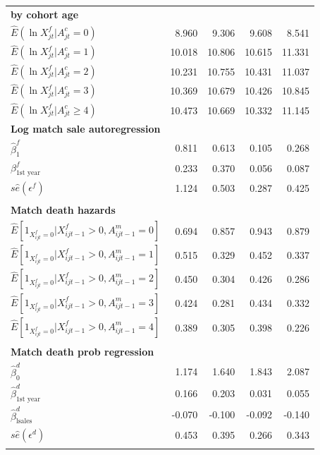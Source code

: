 \documentclass[12pt,titlepage]{article}
\begin{document}
\begin{small}
\begin{longtable}{l|rrrr}
\textbf{by cohort age } &  &  &  &  \\ 
$\widehat{E}(\ln X_{jt}^{f}|A_{jt}^{c}=0)$ & 8.960 & 9.306 & 9.608 & 8.541
\\ 
$\widehat{E}(\ln X_{jt}^{f}|A_{jt}^{c}=1)$ & 10.018 & 10.806 & 10.615 & 
11.331 \\ 
$\widehat{E}(\ln X_{jt}^{f}|A_{jt}^{c}=2)$ & 10.231 & 10.755 & 10.431 & 
11.037 \\ 
$\widehat{E}(\ln X_{jt}^{f}|A_{jt}^{c}=3)$ & 10.369 & 10.679 & 10.426 & 
10.845 \\ 
$\widehat{E}(\ln X_{jt}^{f}|A_{jt}^{c}\geq 4)$ & 10.473 & 10.669 & 10.332 & 
11.145 \\
\textbf{Log match sale autoregression} &  &  &  &  \\ 
$\widehat{\beta }_{1}^{f}$ & 0.811 & 0.613 & 0.105 & 0.268 \\ 
$\beta _{\mbox{1st
year}}^{f}$ & 0.233 & 0.370 & 0.056 & 0.087 \\ 
$s\widehat{e}(\epsilon ^{f})$ & 1.124 & 0.503 & 0.287 & 0.425 \\ 
&  &  &  &  \\ 
\textbf{Match death hazards} &  &  &  &  \\ 
$\widehat{E}[1_{X_{ijt}^{f}=0}|X_{ijt-1}^{f}>0,A_{ijt-1}^{m}=0]$ & 0.694 & 
0.857 & 0.943 & 0.879 \\ 
$\widehat{E}[1_{X_{ijt}^{f}=0}|X_{ijt-1}^{f}>0,A_{ijt-1}^{m}=1]$ & 0.515 & 
0.329 & 0.452 & 0.337 \\ 
$\widehat{E}[1_{X_{ijt}^{f}=0}|X_{ijt-1}^{f}>0,A_{ijt-1}^{m}=2]$ & 0.450 & 
0.304 & 0.426 & 0.286 \\ 
$\widehat{E}[1_{X_{ijt}^{f}=0}|X_{ijt-1}^{f}>0,A_{ijt-1}^{m}=3]$ & 0.424 & 
0.281 & 0.434 & 0.332 \\ 
$\widehat{E}[1_{X_{ijt}^{f}=0}|X_{ijt-1}^{f}>0,A_{ijt-1}^{m}=4]$ & 0.389 & 
0.305 & 0.398 & 0.226 \\ 
\multicolumn{1}{r}{} &  &  &  &  \\ 
\textbf{Match death prob regression} &  &  &  &  \\ 
$\widehat{\beta }_{0}^{d}$ & 1.174 & 1.640 & 1.843 & 2.087 \\ 
$\widehat{\beta }_{\mbox{1st year}}^{d}$ & 0.166 & 0.203 & 0.031 & 0.055 \\ 
$\widehat{\beta }_{\mbox{lsales}}^{d}$ & -0.070 & -0.100 & -0.092 & -0.140
\\ 
$s\widehat{e}(\epsilon ^{d})$ & 0.453 & 0.395 & 0.266 & 0.343 \\ 
\multicolumn{1}{r}{} &  &  &  &  \\ 

\end{longtable}
\end{small}
\end{document}

